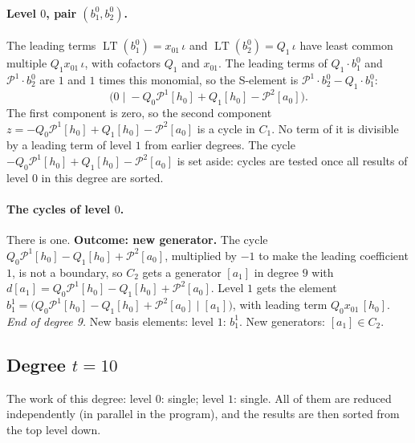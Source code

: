 \documentclass[11pt]{article}
\renewcommand{\P}{\mathcal{P}}
\DeclareMathOperator{\LT}{LT}
\begin{document}
\paragraph{Level $0$, pair $(b^{0}_{1}, b^{0}_{2})$.} The leading terms $\LT(b^{0}_{1}) = x_{01}\,\iota$ and $\LT(b^{0}_{2}) = Q_{1}\,\iota$ have least common multiple $Q_{1}x_{01}\,\iota$, with cofactors $Q_{1}$ and $x_{01}$.
The leading terms of $Q_{1}\cdot b^{0}_{1}$ and $\P^{1}\cdot b^{0}_{2}$ are $1$ and $1$ times this monomial, so the S-element is $\P^{1}\cdot b^{0}_{2} - Q_{1}\cdot b^{0}_{1}$:
\[\bigl(0 \;\big|\; -Q_{0}\P^{1}[h_0] + Q_{1}[h_0] - \P^{2}[a_0]\bigr).\]
The first component is zero, so the second component $z = -Q_{0}\P^{1}[h_0] + Q_{1}[h_0] - \P^{2}[a_0]$ is a cycle in $C_{1}$.
No term of it is divisible by a leading term of level $1$ from earlier degrees.
The cycle $-Q_{0}\P^{1}[h_0] + Q_{1}[h_0] - \P^{2}[a_0]$ is set aside: cycles are tested once all results of level $0$ in this degree are sorted.
\medskip
\paragraph{The cycles of level $0$.} There is one.
\textbf{Outcome: new generator.} The cycle $Q_{0}\P^{1}[h_0] - Q_{1}[h_0] + \P^{2}[a_0]$, multiplied by $-1$ to make the leading coefficient $1$, is not a boundary, so $C_{2}$ gets a generator $[a_1]$ in degree $9$ with $d[a_1] = Q_{0}\P^{1}[h_0] - Q_{1}[h_0] + \P^{2}[a_0]$.
Level $1$ gets the element $b^{1}_{1} = \bigl(Q_{0}\P^{1}[h_0] - Q_{1}[h_0] + \P^{2}[a_0] \;\big|\; [a_1]\bigr)$, with leading term $Q_{0}x_{01}\,[h_0]$.
\medskip\noindent\emph{End of degree 9.} New basis elements: level $1$: $b^{1}_{1}$. New generators: $[a_1]\in C_{2}$.
\subsection*{Degree $t = 10$}
\noindent The work of this degree: level $0$: single; level $1$: single. All of them are reduced independently (in parallel in the program), and the results are then sorted from the top level down.
\medskip
\end{document}
